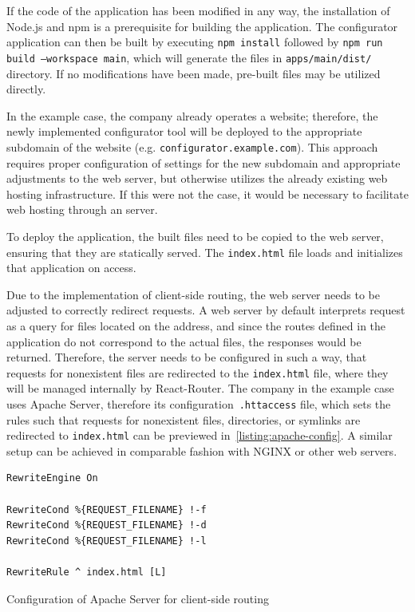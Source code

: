 If the code of the application has been modified in any way, the installation of Node.js and npm is a prerequisite for building the application. The configurator application can then be built by executing \texttt{npm install} followed by \texttt{npm run build --workspace main}, which will generate the files in \texttt{apps/main/dist/} directory. If no modifications have been made, pre-built files may be utilized directly.

In the example case, the company already operates a website; therefore, the newly implemented configurator tool will be deployed to the appropriate subdomain of the website (e.g. \texttt{configurator.example.com}). This approach requires proper configuration of  settings for the new subdomain and appropriate adjustments to the web server, but otherwise utilizes the already existing web hosting infrastructure. If this were not the case, it would be necessary to facilitate web hosting through an  server.

To deploy the application, the built files need to be copied to the web server, ensuring that they are statically served. The \texttt{index.html} file loads and initializes that application on access.

Due to the implementation of client-side routing, the web server needs to be adjusted to correctly redirect requests. A web server by default interprets request as a query for files located on the  address, and since the routes defined in the application do not correspond to the actual files, the  responses would be returned. Therefore, the server needs to be configured in such a way, that requests for nonexistent files are redirected to the \texttt{index.html} file, where they will be managed internally by React-Router. The company in the example case uses Apache  Server, therefore its configuration~\texttt{.httaccess} file, which sets the rules such that requests for nonexistent files, directories, or symlinks are redirected to \texttt{index.html} can be previewed in~\autoref{listing:apache-config}. A similar setup can be achieved in comparable fashion with NGINX or other web servers.

\begin{listing}[h]
\begin{verbatim}
RewriteEngine On
 
RewriteCond %{REQUEST_FILENAME} !-f
RewriteCond %{REQUEST_FILENAME} !-d
RewriteCond %{REQUEST_FILENAME} !-l
 
RewriteRule ^ index.html [L]
\end{verbatim}
\caption{Configuration of Apache  Server for client-side routing}
\label{listing:apache-config}
\end{listing}

